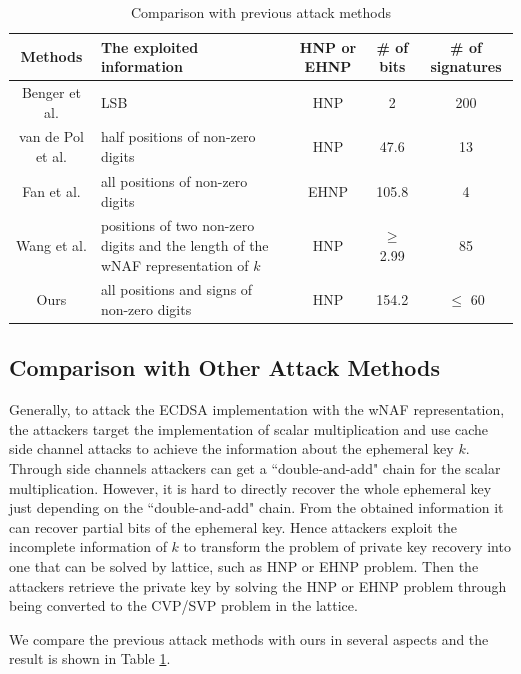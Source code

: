 \begin{table}[!t]
  \centering
   \caption{Comparison with previous attack methods}\label{compare1}
\begin{tabular}{|c|m{90pt}|c|c|c|}
  \hline
  Methods & The exploited information & HNP or EHNP & \# of bits & \# of signatures \\
  \hline
  Benger et al. \cite{Benger2014} & LSB & HNP & 2 & 200 \\
  \hline
  van de Pol et al. \cite{Van2015} & half positions of non-zero digits & HNP & 47.6 & 13 \\
  \hline
  Fan et al. \cite{Fan2016} & all positions of non-zero digits & EHNP & 105.8 & 4 \\
  \hline
  Wang et al. \cite{Wang2017} & positions of two non-zero digits and the length of the wNAF representation of $k$ & HNP & $\geq$ 2.99 & 85 \\
  \hline
  Ours & all positions and signs of non-zero digits & HNP & 154.2  & $\leq$ 60 \\
  \hline
\end{tabular}
\end{table}

\subsection{Comparison with Other Attack Methods}
\label{compare}

 Generally,  to attack the ECDSA implementation with the wNAF representation,
   the attackers target the implementation of scalar multiplication
      and use cache side channel attacks to achieve the information about the ephemeral key $k$.
Through side channels attackers can get a ``double-and-add" chain for the scalar multiplication.
However,
 it is hard to directly recover the whole ephemeral key just depending on the ``double-and-add" chain.
From the obtained information it can recover partial bits of the ephemeral key.
Hence attackers exploit the incomplete information of $k$ to transform the problem of private key recovery into one that can be solved by lattice, such as HNP or EHNP problem.
 Then the attackers retrieve the private key by solving the HNP or EHNP problem through being converted to the CVP/SVP problem in the lattice.

We compare the previous attack methods with ours in several aspects and the result is shown in Table \ref{compare1}.

